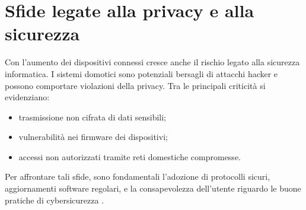\section{Sfide legate alla privacy e alla sicurezza}
Con l'aumento dei dispositivi connessi cresce anche il rischio legato alla sicurezza informatica. I sistemi domotici sono potenziali bersagli di attacchi hacker e possono comportare violazioni della privacy. Tra le principali criticità si evidenziano:
\begin{itemize}
    \item trasmissione non cifrata di dati sensibili;
    \item vulnerabilità nei firmware dei dispositivi;
    \item accessi non autorizzati tramite reti domestiche compromesse.
\end{itemize}

Per affrontare tali sfide, sono fondamentali l'adozione di protocolli sicuri, aggiornamenti software regolari, e la consapevolezza dell'utente riguardo le buone pratiche di cybersicurezza \parencite{nistIotSecurity}.


